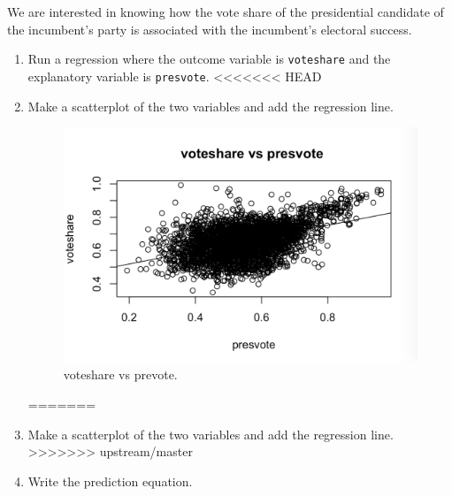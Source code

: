 \documentclass[12pt,letterpaper]{article}
\begin{document}
	\noindent We are interested in knowing how the vote share of the presidential candidate of the incumbent's party is associated with the incumbent's electoral success.
	\vspace{.25cm}
	\begin{enumerate}
		\item Run a regression where the outcome variable is \texttt{voteshare} and the explanatory variable is \texttt{presvote}.
<<<<<<< HEAD
			  
		\item Make a scatterplot of the two variables and add the regression line.
			   
		\begin{figure}[h!]
			\includegraphics[width=\linewidth]{PS33}
			\caption{voteshare vs prevote.}
			\label{fig:PS33}
		\end{figure}
=======
		\vspace{5cm}
		\item Make a scatterplot of the two variables and add the regression line. 
		\vspace{5cm}
>>>>>>> upstream/master
		\item Write the prediction equation.
			  
	\end{enumerate}
	
	
	\newpage	
\end{document}

